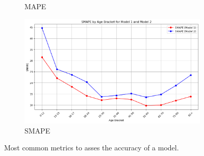 \documentclass[10pt]{article}
\begin{document}
\begin{figure}[ht]
\begin{subfigure}{0.32\textwidth}
        \caption{MAPE}
        \label{fig:mape}
    \end{subfigure}
    \hfill
    \begin{subfigure}{0.32\textwidth}
        \centering
        \includegraphics[width=\textwidth]{images/4_SMAPE.png}
        \caption{SMAPE}
        \label{fig:smape}
    \end{subfigure}
    \caption{Most common metrics to asses the accuracy of a model.}
    \label{fig:metrics}
\end{figure}
\end{document}
